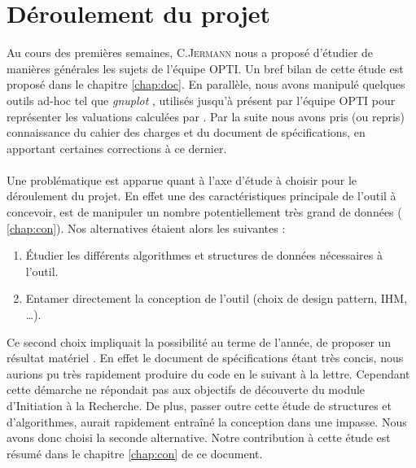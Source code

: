 \section{Déroulement du projet}
Au cours des premières semaines, C.\textsc{Jermann} nous a proposé d'étudier de manières générales les sujets de l'équipe \textsc{OPTI}. Un bref bilan de cette étude est proposé dans le chapitre \ref{chap:doc}. En parallèle, nous avons manipulé quelques outils ad-hoc tel que \emph{gnuplot} \cite{gnu}, utilisés jusqu'à présent par l'équipe \textsc{OPTI} pour représenter les valuations calculées par \realpaver. Par la suite nous avons pris (ou repris) connaissance du cahier des charges et du document de spécifications, en apportant certaines corrections à ce dernier. 

\paragraph{}Une problématique est apparue quant à l'axe d'étude à choisir pour le déroulement du projet. En effet une des caractéristiques principale de l'outil à concevoir, est de manipuler un nombre potentiellement très grand de données (\cf{} \ref{chap:con}). Nos alternatives étaient alors les suivantes : 
\begin{enumerate}
\item
Étudier les différents algorithmes et structures de données nécessaires à l'outil.
\item
Entamer directement la conception de l'outil (choix de design pattern, IHM, \dots).
\end{enumerate} 
Ce second choix impliquait la possibilité au terme de l'année, de proposer un résultat \og matériel \fg{}. En effet le document de spécifications étant très concis, nous aurions pu très rapidement produire du code en le suivant à la lettre. Cependant cette démarche ne répondait pas aux objectifs de découverte du module d'Initiation à la Recherche. De plus, passer outre cette étude de structures et d'algorithmes, aurait rapidement entraîné la conception dans une impasse. Nous avons donc choisi la seconde alternative. Notre contribution à cette étude est résumé dans le chapitre \ref{chap:con} de ce document.


